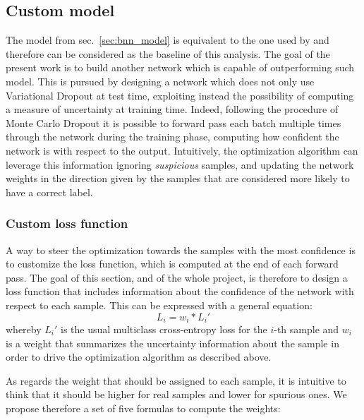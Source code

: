 \documentclass[11pt,twoside,a4paper]{article}
\begin{document}
\subsection{Custom model}
\label{sec:custom_model}
The model from sec.~\ref{sec:bnn_model} is equivalent to the one used by \cite{kwon2018uncertainty} and therefore can be considered as the baseline of this analysis. The goal of the present work is to build another network which is capable of outperforming such model.\newline
This is pursued by designing a network which does not only use Variational Dropout at test time, exploiting instead the possibility of computing a measure of uncertainty at training time. Indeed, following the procedure of Monte Carlo Dropout it is possible to forward pass each batch multiple times through the network during the training phase, computing how confident the network is with respect to the output.\newline
Intuitively, the optimization algorithm can leverage this information ignoring \textit{suspicious} samples, and updating the network weights in the direction given by the samples that are considered more likely to have a correct label.\newline

\subsubsection{Custom loss function}
\label{sec:loss}
A way to steer the optimization towards the samples with the most confidence is to customize the loss function, which is computed at the end of each forward pass. The goal of this section, and of the whole project, is therefore to design a loss function that includes information about the confidence of the network with respect to each sample. This can be expressed with a general equation:
\begin{equation}
\label{eq1}
L_{i} = w_{i} * {L_{i}}'
\end{equation}
whereby \({L_{i}}'\) is the usual multiclass cross-entropy loss for the \(i\)-th sample and \(w_{i}\) is a weight that summarizes the uncertainty information about the sample in order to drive the optimization algorithm as described above.

As regards the weight that should be assigned to each sample, it is intuitive to think that it should be higher for real samples and lower for spurious ones. We propose therefore a set of five formulas to compute the weights:
\end{document}
